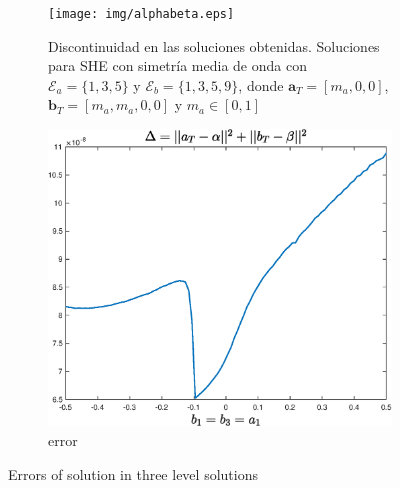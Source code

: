 \begin{enumerate}
\begin{figure}
    \end{figure}





    \begin{figure}
        \centering
        \begin{subfigure}[b]{\textwidth}
            \centering
            \texttt{[image: img/alphabeta.eps]}
            \caption{Discontinuidad en las soluciones obtenidas. Soluciones para SHE con simetría media de onda con $\mathcal{E}_a = \{1,3,5\}$ y  $\mathcal{E}_b = \{1,3,5,9\}$, donde $\bm{a}_T = [m_a,0,0]$, $\bm{b}_T = [m_a,m_a,0,0]$ y  $m_a \in [0,1]$}
        \end{subfigure} 
        \hfill 
        \begin{subfigure}[b]{\textwidth}
            \centering
            \includegraphics[scale=0.4]{img/alphabeta_error.eps}
            \caption{error}
        \end{subfigure}
        \caption{Errors of solution in three level solutions}
        \label{ex3LVL}
    \end{figure}


\end{enumerate}






